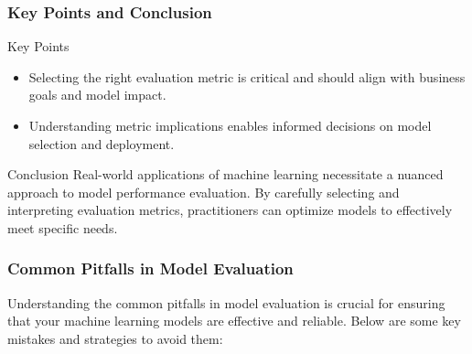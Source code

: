 \documentclass[aspectratio=169]{beamer}
\begin{document}
\begin{frame}[fragile]
    \frametitle{Key Points and Conclusion}
    \begin{block}{Key Points}
        \begin{itemize}
            \item Selecting the right evaluation metric is critical and should align with business goals and model impact.
            \item Understanding metric implications enables informed decisions on model selection and deployment.
        \end{itemize}
    \end{block}

    \begin{block}{Conclusion}
        Real-world applications of machine learning necessitate a nuanced approach to model performance evaluation. By carefully selecting and interpreting evaluation metrics, practitioners can optimize models to effectively meet specific needs.
    \end{block}
\end{frame}

\begin{frame}[fragile]
    \frametitle{Common Pitfalls in Model Evaluation}
    Understanding the common pitfalls in model evaluation is crucial for ensuring that your machine learning models are effective and reliable. Below are some key mistakes and strategies to avoid them:
\end{frame}
\end{document}
